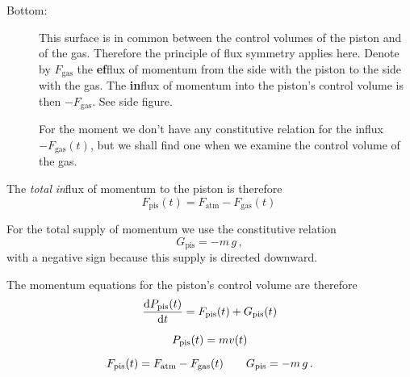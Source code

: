 \documentclass[a4paper,12pt,%
onecolumn,oneside,%
british%
]{memoir}
\newcommand*{\di}{\mathrm{d}}%
\renewcommand*{\|}[1][]{\nonscript\:#1\vert\nonscript\:\mathopen{}}
\newcommand*{\dt}{\di t}
\newcommand*{\ym}{m}%
\newcommand*{\yPpi}{P_{\textrm{pis}}}
\newcommand*{\yGpi}{G_{\textrm{pis}}}
\newcommand*{\yFpi}{F_{\textrm{pis}}}
\newcommand*{\yFgas}{F_{\textrm{gas}}}
\newcommand*{\yFatm}{F_{\textrm{atm}}}
\begin{document}
\begin{description}
\item[Bottom:] This surface is in common between the control volumes of the piston and of the gas. Therefore the principle of flux symmetry applies here. Denote by $\yFgas$ the \textbf{ef}flux of momentum from the side with the piston to the side with the gas. The \textbf{in}flux of momentum into the piston's control volume is then $-\yFgas$. See side figure.


  For the moment we don't have any constitutive relation for the influx $-\yFgas(t)$, but we shall find one when we examine the control volume of the gas.
\end{description}

The \emph{total} \emph{in}flux of momentum to the piston is therefore
\begin{equation}
  \label{eq:F_piston}
  \yFpi(t) = \yFatm - \yFgas(t) \,
\end{equation}

\medskip

For the total supply of momentum we use the constitutive relation
\begin{equation}
  \label{eq:piston_G}
  \yGpi = -\ym\,g \,,
\end{equation}
with a negative sign because this supply is directed downward.

\medskip

The momentum equations for the piston's control volume are therefore
\begin{equation}
  \label{eq:piston_equations}
  \begin{gathered}
    \frac{\di \yPpi(t)}{\dt} = \yFpi(t) + \yGpi(t)
    \\[2\jot]
    \yPpi(t) = \ym v(t)
    \\[2\jot]
    \yFpi(t) = \yFatm - \yFgas(t)
    \qquad
    \yGpi = -\ym\,g
    \,.
  \end{gathered}
\end{equation}
\end{document}
